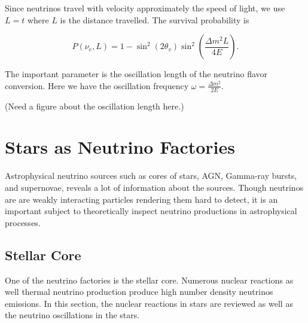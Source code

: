 Since neutrinos travel with velocity approximately the speed of light, we use $L = t$ where $L$ is the distance travelled. The survival probability is

\begin{equation}
P(\nu_e,L) =  1-\sin^2(2\theta_v)\sin^2\left( \frac{\Delta m^2 L}{4E} \right).
\end{equation}


The important parameter is the oscillation length of the neutrino flavor conversion. Here we have the oscillation frequency $\omega = \frac{\Delta m^2}{2E}$.

(Need a figure about the oscillation length here.)




\section{\label{chap:basics-section:astro}Stars as Neutrino Factories}

Astrophysical neutrino sources such as cores of stars, AGN, Gamma-ray bursts, and supernovae, reveals a lot of information about the sources. Though neutrinos are are weakly interacting particles rendering them hard to detect, it is an important subject to theoretically inspect neutrino productions in astrophysical processes.






\subsection{Stellar Core}

One of the neutrino factories is the stellar core. Numerous nuclear reactions as well thermal neutrino production produce high number density neutrinos emissions. In this section, the nuclear reactions in stars are reviewed as well as the neutrino oscillations in the stars.

